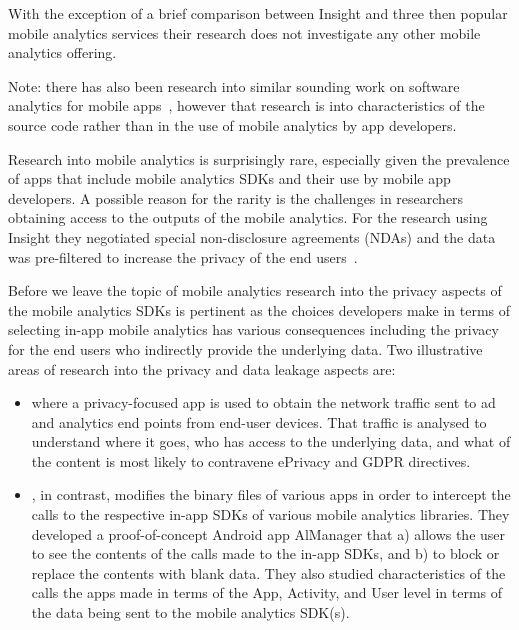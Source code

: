 With the exception of a brief comparison between Insight and three then popular mobile analytics services their research does not investigate any other mobile analytics offering.

Note: there has also been research into similar sounding work on software analytics for mobile apps~\citet{minelli2013_software_analytics_samoa}, however that research is into characteristics of the source code rather than in the use of mobile analytics by app developers.

Research into mobile analytics is surprisingly rare, especially given the prevalence of apps that include mobile analytics SDKs and their use by mobile app developers. A possible reason for the rarity is the challenges in researchers obtaining access to the outputs of the mobile analytics. For the research using Insight they negotiated special non-disclosure agreements (NDAs) and the data was pre-filtered to increase the privacy of the end users~\citep[p. 91]{patro2015_building_blocks_to_understand_wireless_experience}. 

Before we leave the topic of mobile analytics research into the privacy aspects of the mobile analytics SDKs is pertinent as the choices developers make in terms of selecting in-app mobile analytics has various consequences including the privacy for the end users who indirectly provide the underlying data. Two illustrative areas of research into the privacy and data leakage aspects are:

\begin{itemize}
        \item \citet{razaghpanah2018_apps_trackers_privacy_and_regulators_a_global_study_of_the_mobile_tracking_ecosystem} where a privacy-focused app is used to obtain the network traffic sent to ad and analytics end points from end-user devices. That traffic is analysed to understand where it goes, who has access to the underlying data, and what of the content is most likely to contravene ePrivacy and GDPR directives.
        \item \citet{liu2020_privacy_risk_analysis_and_mitigation_of_analytics_libraries_in_the_android_ecosystem}, in contrast, modifies the binary files of various apps in order to intercept the calls to the respective in-app SDKs of various mobile analytics libraries. They developed a proof-of-concept Android app AlManager that a) allows the user to see the contents of the calls made to the in-app SDKs, and b) to block or replace the contents with blank data. They also studied characteristics of the calls the apps made in terms of the App, Activity, and User level in terms of the data being sent to the mobile analytics SDK(s).
\end{itemize}

